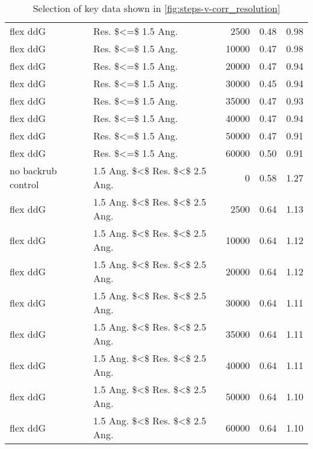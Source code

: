 \begin{table}
\begin{tabular}{llrrr}
           flex ddG &              Res. \$<=\$ 1.5 Ang. &          2500 & 0.48 & 0.98 \\
           flex ddG &              Res. \$<=\$ 1.5 Ang. &         10000 & 0.47 & 0.98 \\
           flex ddG &              Res. \$<=\$ 1.5 Ang. &         20000 & 0.47 & 0.94 \\
           flex ddG &              Res. \$<=\$ 1.5 Ang. &         30000 & 0.45 & 0.94 \\
           flex ddG &              Res. \$<=\$ 1.5 Ang. &         35000 & 0.47 & 0.93 \\
           flex ddG &              Res. \$<=\$ 1.5 Ang. &         40000 & 0.47 & 0.94 \\
           flex ddG &              Res. \$<=\$ 1.5 Ang. &         50000 & 0.47 & 0.91 \\
           flex ddG &              Res. \$<=\$ 1.5 Ang. &         60000 & 0.50 & 0.91 \\
 no backrub control &  1.5 Ang. \$<\$ Res. \$<\$ 2.5 Ang. &             0 & 0.58 & 1.27 \\
           flex ddG &  1.5 Ang. \$<\$ Res. \$<\$ 2.5 Ang. &          2500 & 0.64 & 1.13 \\
           flex ddG &  1.5 Ang. \$<\$ Res. \$<\$ 2.5 Ang. &         10000 & 0.64 & 1.12 \\
           flex ddG &  1.5 Ang. \$<\$ Res. \$<\$ 2.5 Ang. &         20000 & 0.64 & 1.12 \\
           flex ddG &  1.5 Ang. \$<\$ Res. \$<\$ 2.5 Ang. &         30000 & 0.64 & 1.11 \\
           flex ddG &  1.5 Ang. \$<\$ Res. \$<\$ 2.5 Ang. &         35000 & 0.64 & 1.11 \\
           flex ddG &  1.5 Ang. \$<\$ Res. \$<\$ 2.5 Ang. &         40000 & 0.64 & 1.11 \\
           flex ddG &  1.5 Ang. \$<\$ Res. \$<\$ 2.5 Ang. &         50000 & 0.64 & 1.10 \\
           flex ddG &  1.5 Ang. \$<\$ Res. \$<\$ 2.5 Ang. &         60000 & 0.64 & 1.10 \\
\bottomrule
\end{tabular}

\caption[]{Selection of key data shown in \cref{fig:steps-v-corr_resolution}}
\label{tab:steps-v-corr_resolution-underlying-data}
\end{table}
